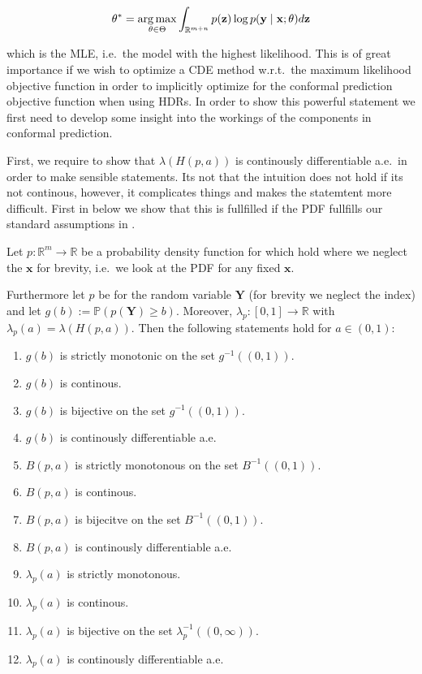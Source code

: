 \begin{equation}
    \theta^* = \operatorname*{arg\,max}_{\theta \in \Theta}  \int_{\mathbb{R}^{m + n}}
    p(\mathbf{z}) \log p(\mathbf{y} \mid \mathbf{x}; \theta) d
    \mathbf{z}
\end{equation}

which is the MLE, i.e.\ the model with the highest likelihood. This is of great importance if we wish to optimize a CDE method w.r.t.\ the maximum likelihood objective function in order to implicitly optimize for the conformal prediction objective function when using HDRs. In order to show this powerful statement we first need to develop some insight into the workings of the components in conformal prediction.

First, we require to show that $\lambda(H(p, a))$ is continously differentiable a.e.\ in order to make sensible statements. Its not that the intuition does not hold if its not continous, however, it complicates things and makes the statemtent more difficult. First in  below we show that this is fullfilled if the PDF fullfills our standard assumptions in .

\begin{lemma}\label{lem:continuity}
    Let \(p: \mathbb{R}^m \to \mathbb{R}\) be a probability density function for which  hold where we neglect the $\mathbf{x}$ for brevity, i.e.\ we look at the PDF for any fixed $\mathbf{x}$.

    Furthermore let $p$ be for the random variable $\mathbf{Y}$ (for brevity we neglect the index) and let $g(b) := \mathbb{P}(p(\mathbf{Y}) \geq b)$. Moreover, $\lambda_p:[0, 1] \to \mathbb{R}$ with $\lambda_p(a) = \lambda(H(p, a))$. Then the following statements hold for $a \in (0,1)$:

    \begin{enumerate}
        \item $g(b)$ is strictly monotonic on the set $g^{-1}((0,1))$.
        \item $g(b)$ is continous.
        \item $g(b)$ is bijective on the set $g^{-1}((0,1))$.
        \item $g(b)$ is continously differentiable a.e.
        \item $B(p, a)$ is strictly monotonous on the set $B^{-1}((0,1))$.
        \item $B(p, a)$ is continous.
        \item $B(p, a)$ is bijecitve on the set $B^{-1}((0,1))$.
        \item $B(p, a)$ is continously differentiable a.e.
        \item $\lambda_p(a)$ is strictly monotonous.
        \item $\lambda_p(a)$ is continous.
        \item $\lambda_p(a)$ is bijective on the set $\lambda_p^{-1}((0,\infty))$.
        \item $\lambda_p(a)$ is continously differentiable a.e.
    \end{enumerate}
\end{lemma}

